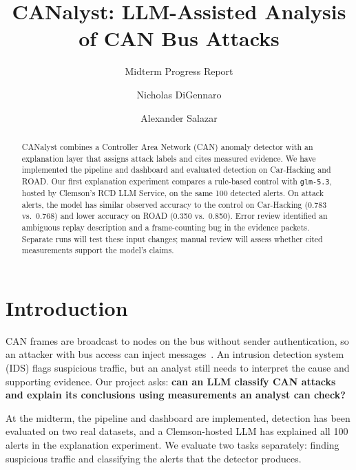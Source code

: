\documentclass[sigconf]{acmart}
\begin{document}
\title{CANalyst: LLM-Assisted Analysis of CAN Bus Attacks}
\subtitle{Midterm Progress Report}

\author{Nicholas DiGennaro}

\author{Alexander Salazar}

\renewcommand{\shortauthors}{DiGennaro and Salazar}

\begin{abstract}
CANalyst combines a Controller Area Network (CAN) anomaly detector with an explanation layer that assigns attack labels and cites measured evidence. We have implemented the pipeline and dashboard and evaluated detection on Car-Hacking and ROAD. Our first explanation experiment compares a rule-based control with \texttt{glm-5.3}, hosted by Clemson's RCD LLM Service, on the same 100 detected alerts. On attack alerts, the model has similar observed accuracy to the control on Car-Hacking (0.783 vs.\ 0.768) and lower accuracy on ROAD (0.350 vs.\ 0.850). Error review identified an ambiguous replay description and a frame-counting bug in the evidence packets. Separate runs will test these input changes; manual review will assess whether cited measurements support the model's claims.
\end{abstract}

\maketitle

\section{Introduction}
CAN frames are broadcast to nodes on the bus without sender authentication, so an attacker with bus access can inject messages~\cite{koscher2010experimental,miller2015remote}. An intrusion detection system (IDS) flags suspicious traffic, but an analyst still needs to interpret the cause and supporting evidence. Our project asks: \textbf{can an LLM classify CAN attacks and explain its conclusions using measurements an analyst can check?}

At the midterm, the pipeline and dashboard are implemented, detection has been evaluated on two real datasets, and a Clemson-hosted LLM has explained all 100 alerts in the explanation experiment. We evaluate two tasks separately: finding suspicious traffic and classifying the alerts that the detector produces.
\end{document}
